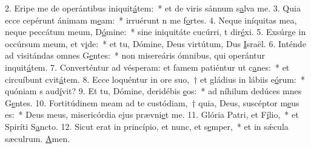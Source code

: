 2. Eripe me de operántibus iniquit\uline{á}tem:~* et de viris sánnum s\uline{a}lva me.
3. Quia ecce cepérunt ánimam m\uline{e}am:~* irruérunt n me f\uline{o}rtes.
4. Neque iníquitas mea, neque peccátum meum, D\uline{ó}mine:~* sine iniquitáte cucúrri, t dir\uline{é}xi.
5. Exsúrge in occúrsum meum, et v\uline{i}de:~* et tu, Dómine, Deus virtútum, Dus \uline{I}sraël.
6. Inténde ad visitándas omnes G\uline{e}ntes:~* non misereáris ómnibus, qui operántur inquit\uline{á}tem.
7. Converténtur ad vésperam: et famem patiéntur ut c\uline{a}nes:~* et circuíbunt cvit\uline{á}tem.
8. Ecce loquéntur in ore suo,~† et gládius in lábiis e\uline{ó}rum:~* quóniam s aud\uline{í}vit?
9. Et tu, Dómine, deridébis \uline{e}os:~* ad níhilum dedúces mnes G\uline{e}ntes.
10. Fortitúdinem meam ad te custódiam,~† quia, Deus, suscéptor m\uline{e}us es:~* Deus meus, misericórdia ejus prævni\uline{e}t me.
11. Glória Patri, et F\uline{í}lio,~* et Spiríti S\uline{a}ncto.
12. Sicut erat in princípio, et nunc, et s\uline{e}mper,~* et in sǽcula sæculrum. \uline{A}men.
